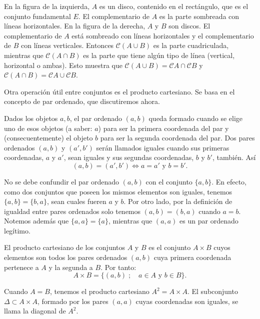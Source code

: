 \documentclass[12pt,oneside]{book}
\begin{document}
En la figura de la izquierda, \( A \) es un disco, contenido en el rectángulo, que es el conjunto fundamental \( E \). El complementario de \( A \) es la parte sombreada con líneas horizontales. En la figura de la derecha, \( A \) y \( B \) son discos. El complementario de \( A \) está sombreado con líneas horizontales y el complementario de \( B \) con líneas verticales. Entonces \( \mathcal{C}(A \cup B) \) es la parte cuadriculada, mientras que \( \mathcal{C}(A \cap B) \) es la parte que tiene algún tipo de línea (vertical, horizontal o ambas). Esto muestra que \( \mathcal{C}(A \cup B) = \mathcal{C}A \cap \mathcal{C}B \) y \( \mathcal{C}(A \cap B) = \mathcal{C}A \cup \mathcal{C}B \).

Otra operación útil entre conjuntos es el producto cartesiano. Se basa en el concepto de par ordenado, que discutiremos ahora.

Dados los objetos \( a, b \), el par ordenado \( (a, b) \) queda formado cuando se elige uno de esos objetos (a saber: \( a \)) para ser la primera coordenada del par y (consecuentemente) el objeto \( b \) para ser la segunda coordenada del par. Dos pares ordenados \( (a, b) \) y \( (a', b') \) serán llamados iguales cuando sus primeras coordenadas, \(a\) y \(a'\), sean iguales y sus segundas coordenadas, \(b\) y \(b'\), también. Así
\[
(a, b) = (a', b') \iff a = a' \text{ y } b = b'.
\]

No se debe confundir el par ordenado \((a, b)\) con el conjunto \(\{a, b\}\). En efecto, como dos conjuntos que poseen los mismos elementos son iguales, tenemos \(\{a, b\} = \{b, a\}\), sean cuales fueren \(a\) y \(b\). Por otro lado, por la definición de igualdad entre pares ordenados solo tenemos \((a, b) = (b, a)\) cuando \(a = b\). Notemos además que \(\{a, a\} = \{a\}\), mientras que \((a, a)\) es un par ordenado legítimo.

El producto cartesiano de los conjuntos \(A\) y \(B\) es el conjunto \(A \times B\) cuyos elementos son todos los pares ordenados \((a, b)\) cuya primera coordenada pertenece a \(A\) y la segunda a \(B\). Por tanto:
\[
A \times B = \{(a, b) \; ; \quad a \in A \text{ y } b \in B\}.
\]

Cuando \(A = B\), tenemos el producto cartesiano \(A^2 = A \times A\). El subconjunto \(\Delta \subset A \times A\), formado por los pares \((a, a)\) cuyas coordenadas son iguales, se llama la diagonal de \(A^2\).
\end{document}

